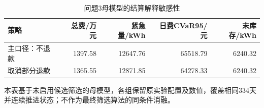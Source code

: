 \begin{table}[htbp]\centering\small
\caption{问题3母模型的结算解释敏感性}
\label{tab:v2_settlement}
\begin{tabularx}{\linewidth}{LRRRR}\toprule
策略 & 总费/万元 & 紧急量/kWh & 日费CVaR95/元 & 末库存/kWh\\\midrule
主口径：不退款 & 1397.58 & 12647.76 & 65518.79 & 6240.32\\
取消部分退款 & 1365.55 & 12871.85 & 64278.33 & 6240.32\\
\bottomrule\end{tabularx}
\par\smallskip\parbox{\linewidth}{\footnotesize 本表基于未启用候选筛选的母模型，各组保留原实验配置及数值，覆盖相同334天并连续推进状态；不作为最终筛选算法的同条件消融。}
\end{table}
